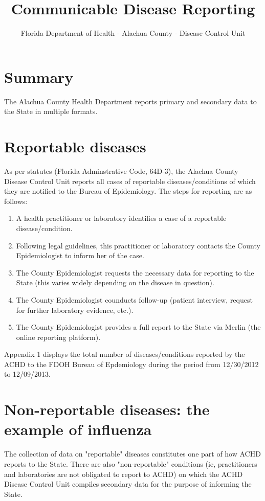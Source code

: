 \documentclass{article}
\title{Communicable Disease Reporting}
\author{Florida Department of Health - Alachua County - Disease Control Unit}
\begin{document}

\maketitle
\begin{center}
\end{center}

\section*{Summary}
The Alachua County Health Department reports primary and secondary data to the State in multiple formats.

\section*{Reportable diseases}
As per  statutes (Florida Adminstrative Code, 64D-3), the Alachua County Disease Control Unit reports all cases of reportable diseases/conditions of which they are notified to the Bureau of Epidemiology. The steps for reporting are as follows: \\
\begin{enumerate}
\item A health practitioner or laboratory identifies a case of a reportable disease/condition.
\item Following legal guidelines, this practitioner or laboratory contacts the County Epidemiologist to inform her of the case.
\item The County Epidemiologist requests the necessary data for reporting to the State (this varies widely depending on the disease in question).
\item The County Epidemiologist counducts follow-up (patient interview, request for further laboratory evidence, etc.).
\item The County Epidemiologist provides a full report to the State via Merlin (the online reporting platform).\\
\end{enumerate}

Appendix 1 displays the total number of diseases/conditions reported by the ACHD to the FDOH Bureau of Epdemiology during the period from 12/30/2012 to 12/09/2013.


\section*{Non-reportable diseases: the example of influenza}
The collection of data on "reportable" diseases constitutes one part of how ACHD reports to the State.  There are also "non-reportable" conditions (ie, practitioners and laboratories are not obligated to report to ACHD) on which the ACHD Disease Control Unit compiles secondary data for the purpose of informing the State. \\
\end{document}
